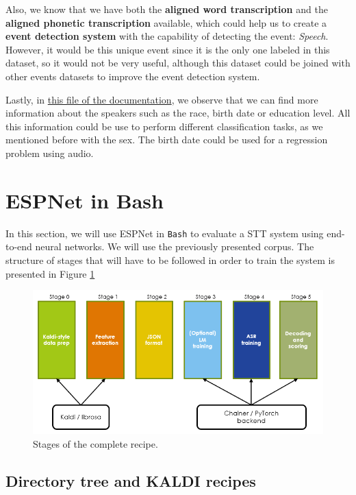 \documentclass[a4paper]{article}
\def\inline{\lstinline[basicstyle=\ttfamily,keywordstyle={}]}
\begin{document}
\begin{itemize}
        Also, we know that we have both the \textbf{aligned word transcription} and the \textbf{aligned phonetic transcription} available, which could help us to create a \textbf{event detection system} with the capability of detecting the event: \emph{Speech}. However, it would be this unique event since it is the only one labeled in this dataset, so it would not be very useful, although this dataset could be joined with other events datasets to improve the event detection system.

        Lastly, in \href{https://catalog.ldc.upenn.edu/docs/LDC93S1/SPKRINFO.TXT}{this file of the documentation}, we observe that we can find more information about the speakers such as the race, birth date or education level. All this information could be use to perform different classification tasks, as we mentioned before with the sex. The birth date could be used for a regression problem using audio.
\end{itemize}

\section{ESPNet in Bash}

In this section, we will use ESPNet in \inline{Bash} to evaluate a STT system using end-to-end neural networks. We will use the previously presented corpus. The structure of stages that will have to be followed in order to train the system is presented in Figure \ref{fig:structure:stages}

\begin{figure}[H]
\centering
\includegraphics[scale=0.6]{Figures/stages}
\caption{Stages of the complete recipe.}
\label{fig:structure:stages}
\end{figure}

\subsection{Directory tree and KALDI recipes}
\end{document}
